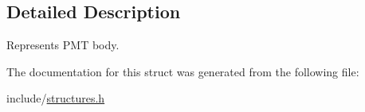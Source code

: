 \subsection{Detailed Description}
Represents P\+MT body. 

The documentation for this struct was generated from the following file\+:\begin{DoxyCompactItemize}
\item 
include/\hyperlink{structures_8h}{structures.\+h}\end{DoxyCompactItemize}
